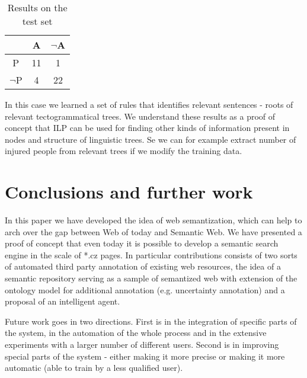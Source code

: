 \documentclass{sig-alternate}
\begin{document}
\begin{table}
\label{tab:results}
\centering
\caption{Results on the test set}
\begin{tabular}{|c|c|c|} \hline
 		&A	&$\neg$A	\\ \hline
P		& 11&1 \\ \hline
$\neg$P	& 4 &22\\ \hline
\hline\end{tabular}
\end{table}


In this case we learned a set of rules that identifies relevant sentences - roots of relevant tectogrammatical trees. We understand these results as a proof of concept that ILP can be used for finding other kinds of information present in nodes and structure of linguistic trees. Se we can for example extract number of injured people from relevant trees if we modify the training data.

\section{Conclusions and further work}
In this paper we have developed the idea of web semantization, which can help to arch over the gap between Web of today and  Semantic Web. We have presented a proof of concept that even today it is possible to develop a semantic search engine in the scale of *.cz pages. In particular contributions consists of two sorts of automated third party annotation of existing web resources, the idea of a semantic repository serving as a sample of semantized web with extension of the ontology model for additional annotation (e.g. uncertainty annotation) and a proposal of an intelligent agent.\par
Future work goes in two directions. First is in the integration of specific parts of the system,  in the automation of the whole process and in the extensive experiments with a larger number of different users. Second is in improving special parts of the system - either making it more precise or making it more automatic (able to train by a less qualified user).

\end{document}
